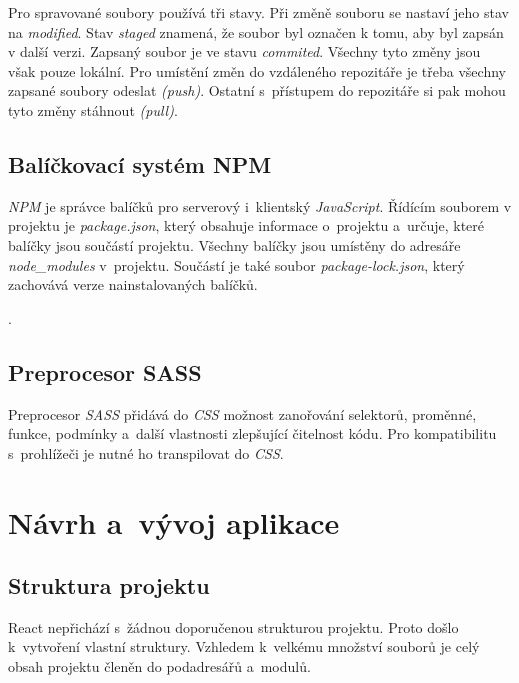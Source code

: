 \documentclass[a4paper,12pt]{article}
\begin{document}
Pro spravované soubory používá tři stavy. Při změně souboru se nastaví jeho stav na \textit{modified}. Stav \textit{staged} znamená, že soubor byl označen k tomu, aby byl zapsán v další verzi. Zapsaný soubor je ve stavu \textit{commited}. Všechny tyto změny jsou však pouze lokální. Pro umístění změn do vzdáleného repozitáře je třeba všechny zapsané soubory odeslat \textit{(push)}. Ostatní s~přístupem do repozitáře si pak mohou tyto změny stáhnout \textit{(pull)}.~\cite{git}

\subsection{Balíčkovací systém NPM}

\textit{NPM} je správce balíčků pro serverový i~klientský \textit{JavaScript}. Řídícím souborem v projektu je \textit{package.json}, který obsahuje informace o~projektu a~určuje, které balíčky jsou součástí projektu.  Všechny balíčky jsou umístěny do adresáře \textit{node\_modules} v~projektu. Součástí je také soubor \textit{package-lock.json}, který zachovává verze nainstalovaných balíčků.~\cite{npm}

.

\subsection{Preprocesor SASS}

Preprocesor \textit{SASS} přidává do \textit{CSS} možnost zanořování selektorů, proměnné, funkce, podmínky a~další vlastnosti zlepšující čitelnost kódu. Pro kompatibilitu s~prohlížeči je nutné ho transpilovat do \textit{CSS}.

\section{Návrh a~vývoj aplikace}

\subsection{Struktura projektu}

React nepřichází s~žádnou doporučenou strukturou projektu. Proto došlo k~vytvoření vlastní struktury. Vzhledem k~velkému množství souborů je celý obsah projektu členěn do podadresářů a~modulů.
\end{document}
